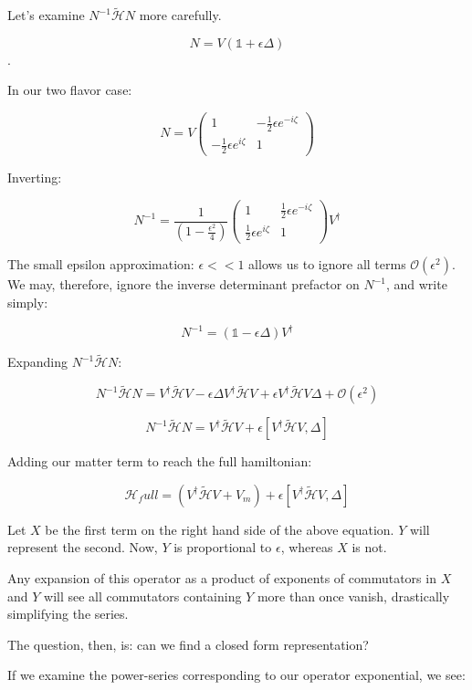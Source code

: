 \documentclass[10pt,letterpaper]{article}
\begin{document}
Let's examine $N^{-1}\tilde{\mathcal{H}}N$ more carefully.

$$N=V(\mathds{1} + \epsilon \Delta)$$.

In our two flavor case:

$$N = V\begin{pmatrix} 1 & -\frac{1}{2}\epsilon e^{-i\zeta} \\ -\frac{1}{2}\epsilon e^{i\zeta} & 1 \end{pmatrix}$$

Inverting:

$$N^{-1} = \frac{1}{(1-\frac{\epsilon^2}{4})} \begin{pmatrix} 1 & \frac{1}{2}\epsilon e^{-i\zeta} \\ \frac{1}{2}\epsilon e^{i\zeta} & 1 \end{pmatrix}V^{\dagger}$$

The small epsilon approximation: $\epsilon << 1$ allows us to ignore all terms $\mathcal{O}(\epsilon^2)$. We may, therefore, ignore the inverse determinant prefactor on $N^{-1}$, and write simply:

$$N^{-1} = (\mathds{1} - \epsilon \Delta)V^{\dagger}$$

Expanding $N^{-1}\tilde{\mathcal{H}}N$:

$$N^{-1}\tilde{\mathcal{H}}N = V^{\dagger}\tilde{\mathcal{H}}V - \epsilon \Delta V^{\dagger}\tilde{\mathcal{H}}V + \epsilon V^{\dagger}\tilde{\mathcal{H}}V \Delta + \mathcal{O}(\epsilon^2)$$

$$N^{-1}\tilde{\mathcal{H}}N = V^{\dagger}\tilde{\mathcal{H}}V + \epsilon [V^{\dagger}\tilde{\mathcal{H}}V,\Delta]$$

Adding our matter term to reach the full hamiltonian:

$$\mathcal{H}_full  = (V^{\dagger}\tilde{\mathcal{H}}V + V_m) + \epsilon [V^{\dagger}\tilde{\mathcal{H}}V,\Delta]$$

Let $X$ be the first term on the right hand side of the above equation. $Y$ will represent the second. Now, $Y$ is proportional to $\epsilon$, whereas $X$ is not.

Any expansion of this operator as a product of exponents of commutators in $X$ and $Y$ will see all commutators containing $Y$ more than once vanish, drastically simplifying the series.

The question, then, is: can we find a closed form representation?

If we examine the power-series corresponding to our operator exponential, we see:
\end{document}
